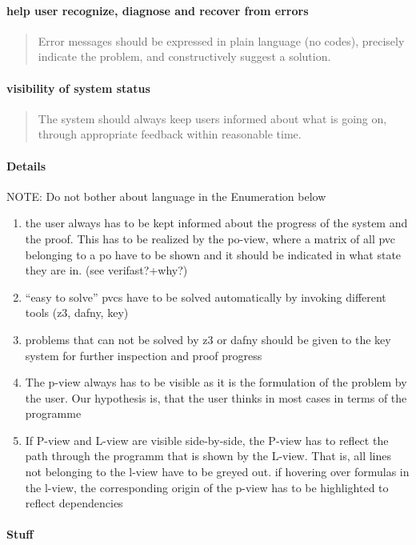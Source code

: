 \documentclass{article}
\begin{document}
\paragraph{help user recognize, diagnose and recover from errors}
\begin{quote}
 Error messages should be expressed in plain language (no codes), precisely 
indicate the problem, and constructively suggest a solution.
\end{quote}

\paragraph{ visibility of system status}
\begin{quote}
 The system should always keep users informed about what is going on, through 
appropriate feedback within reasonable time.
\end{quote}

\paragraph{Details}
NOTE: Do not bother about language in the Enumeration below
\begin{enumerate}
\item the user always has to be kept informed about the progress of the system 
and the proof. This has to be realized by the po-view, where a matrix of all 
pvc belonging to a po have to be shown and it should be indicated in what state
 they are in. (see verifast?+why?)
\item ``easy to solve'' pvcs have to be solved automatically by invoking 
different tools (z3, dafny, key)
\item problems that can not be solved by z3 or dafny should be given to the key 
system for further inspection and proof progress
 \item The  p-view always has to be visible as it is the formulation of the 
problem by the user. Our hypothesis is, that the user thinks in most cases in 
terms of the programme 
 \item If P-view and L-view are 
visible side-by-side, the P-view has to reflect the path through the programm 
that is shown by the L-view. That is, all lines not belonging to the l-view 
have to be greyed out. if hovering over formulas in the l-view, the 
corresponding origin of the p-view has to be highlighted to reflect dependencies

\end{enumerate}


\paragraph{Stuff}
\end{document}

